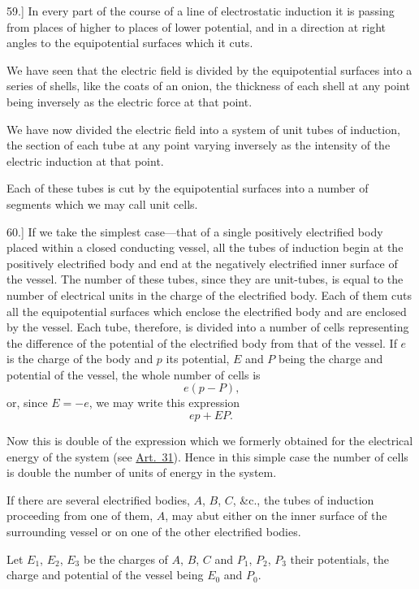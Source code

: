\documentclass[12pt,oneside]{book}[2021/10/04]
\newcommand{\Runhead}[1]{\fancyhead[C]{\iffloatpage{}{\small#1}}}
\newcommand{\article}[1]{\phantomsection \label{art:#1}{#1.]}}
\newcommand{\¬}{\hphantom{0}}
\begin{document}
\article{59} In every part of the course of a line of electrostatic induction
it is passing from places of higher to places of lower
potential, and in a direction at right angles to the equipotential
surfaces which it cuts.
\Runhead{PROPERTIES OF A TUBE OF INDUCTION.}

We have seen that the electric field is divided by the equipotential
surfaces into a series of shells, like the coats of an onion,
the thickness of each shell at any point being inversely as the
electric force at that point.

We have now divided the electric field into a system of unit
tubes of induction, the section of each tube at any point varying
inversely as the intensity of the electric induction at that point.

Each of these tubes is cut by the equipotential surfaces into a
number of segments which we may call unit cells.

\article{60} If we take the simplest case---that of a single positively
electrified body placed within a closed conducting vessel, all the
tubes of induction begin at the positively electrified body and end
at the negatively electrified inner surface of the vessel. The
number of these tubes, since they are unit-tubes, is equal to the
number of electrical units in the charge of the electrified body.
Each of them cuts all the equipotential surfaces which enclose
the electrified body and are enclosed by the vessel. Each tube,
therefore, is divided into a number of cells representing the difference
of the potential of the electrified body from that of the vessel.
If \(e\) is the charge of the body and \(p\) its potential, \(E\) and \(P\) being the
charge and potential of the vessel, the whole number of cells is
\[
e(p - P)\text{,}
\]
or, since \(E = -e\), we may write this expression
\[
ep + EP\text{.}
\]

Now this is double of the expression which we formerly obtained
for the electrical energy of the system (see \hyperref[art:31]{Art.\ 31}). Hence in
this simple case the number of cells is double the number of units
of energy in the system.

If there are several electrified bodies, \(A\), \(B\), \(C\), \&c., the tubes
of induction proceeding from one of them, \(A\), may abut either
on the inner surface of the surrounding vessel or on one of the
other electrified bodies.

Let \(E_1\), \(E_2\), \(E_3\) be the charges of \(A\), \(B\), \(C\) and \(P_1\), \(P_2\), \(P_3\) their
potentials, the charge and potential of the vessel being \(E_0\) and \(P_0\).
\end{document}
